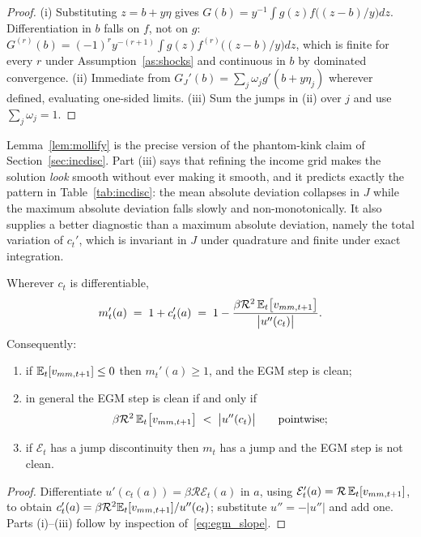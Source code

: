 \begin{proof}
(i) Substituting $z=b+y\eta$ gives $G(b)=y^{-1}\int g(z)f\big((z-b)/y\big)dz$.
Differentiation in $b$ falls on $f$, not on $g$:
$G^{(r)}(b)=(-1)^{r}y^{-(r+1)}\int g(z)f^{(r)}\big((z-b)/y\big)dz$, which is finite for
every $r$ under Assumption~\ref{as:shocks} and continuous in $b$ by dominated
convergence. (ii) Immediate from $G_J'(b)=\sum_j\omega_j g'(b+y\eta_j)$ wherever
defined, evaluating one-sided limits. (iii) Sum the jumps in (ii) over $j$ and use
$\sum_j\omega_j=1$.
\end{proof}

Lemma~\ref{lem:mollify} is the precise version of the phantom-kink claim of
Section~\ref{sec:incdisc}. Part (iii) says that refining the income grid makes the
solution \emph{look} smooth without ever making it smooth, and it predicts exactly the
pattern in Table~\ref{tab:incdisc}: the mean absolute deviation collapses in $J$ while
the maximum absolute deviation falls slowly and non-monotonically. It also supplies a
better diagnostic than a maximum absolute deviation, namely the total variation of
$c_t'$, which is invariant in $J$ under quadrature and finite under exact integration.

\begin{lemma}
\label{lem:egm}
Wherever $c_t$ is differentiable,
\begin{align}
m_t'(a) \;=\; 1+c_t'(a) \;=\; 1 - \frac{\beta\mathcal{R}^{2}\,\mathbb{E}_t\big[v_{mm,t+1}\big]}{\big|u''(c_t)\big|} .
\label{eq:egm_slope}
\end{align}
Consequently:
\begin{enumerate}
    \item if $\mathbb{E}_t[v_{mm,t+1}]\le 0$ then $m_t'(a)\ge 1$, and the EGM step is clean;
    \item in general the EGM step is clean if and only if
    \begin{align}
    \beta\mathcal{R}^{2}\,\mathbb{E}_t\big[v_{mm,t+1}\big] \;<\; \big|u''(c_t)\big|
    \qquad\text{pointwise;}
    \label{eq:egm_condition}
    \end{align}
    \item if $\mathcal{E}_t$ has a jump discontinuity then $m_t$ has a jump and the EGM
    step is not clean.
\end{enumerate}
\end{lemma}

\begin{proof}
Differentiate $u'(c_t(a))=\beta\mathcal{R}\mathcal{E}_t(a)$ in $a$, using
$\mathcal{E}_t'(a)=\mathcal{R}\,\mathbb{E}_t[v_{mm,t+1}]$, to obtain
$c_t'(a)=\beta\mathcal{R}^{2}\mathbb{E}_t[v_{mm,t+1}]/u''(c_t)$; substitute $u''=-|u''|$ and add
one. Parts (i)--(iii) follow by inspection of~\eqref{eq:egm_slope}.
\end{proof}

